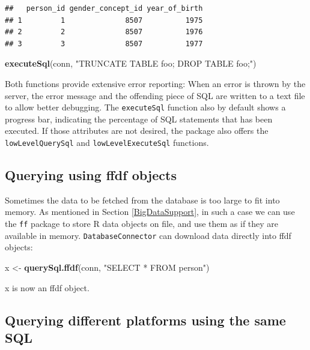 \documentclass[11pt]{book}
\newenvironment{Shaded}{\begin{snugshade}}{\end{snugshade}}
\newcommand{\KeywordTok}[1]{\textcolor[rgb]{0.13,0.29,0.53}{\textbf{#1}}}
\newcommand{\NormalTok}[1]{#1}
\newcommand{\StringTok}[1]{\textcolor[rgb]{0.31,0.60,0.02}{#1}}
\theoremstyle{definition}
\theoremstyle{definition}
\theoremstyle{definition}
\theoremstyle{remark}
\begin{document}
\begin{verbatim}
##   person_id gender_concept_id year_of_birth
## 1         1              8507          1975
## 2         2              8507          1976
## 3         3              8507          1977
\end{verbatim}

\begin{Shaded}
\begin{Highlighting}[]
\KeywordTok{executeSql}\NormalTok{(conn, }\StringTok{"TRUNCATE TABLE foo; DROP TABLE foo;"}\NormalTok{)}
\end{Highlighting}
\end{Shaded}

Both functions provide extensive error reporting: When an error is thrown by the server, the error message and the offending piece of SQL are written to a text file to allow better debugging. The \texttt{executeSql} function also by default shows a progress bar, indicating the percentage of SQL statements that has been executed. If those attributes are not desired, the package also offers the \texttt{lowLevelQuerySql} and \texttt{lowLevelExecuteSql} functions.

\hypertarget{querying-using-ffdf-objects}{%
\subsection{Querying using ffdf objects}\label{querying-using-ffdf-objects}}

Sometimes the data to be fetched from the database is too large to fit into memory. As mentioned in Section \ref{BigDataSupport}, in such a case we can use the \texttt{ff} package to store R data objects on file, and use them as if they are available in memory. \texttt{DatabaseConnector} can download data directly into ffdf objects:

\begin{Shaded}
\begin{Highlighting}[]
\NormalTok{x <-}\StringTok{ }\KeywordTok{querySql.ffdf}\NormalTok{(conn, }\StringTok{"SELECT * FROM person"}\NormalTok{)}
\end{Highlighting}
\end{Shaded}

x is now an ffdf object.

\hypertarget{querying-different-platforms-using-the-same-sql}{%
\subsection{Querying different platforms using the same SQL}\label{querying-different-platforms-using-the-same-sql}}
\end{document}
